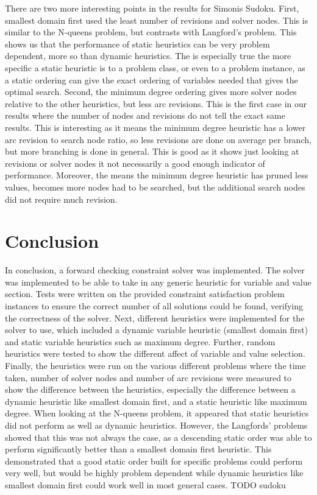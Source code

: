 \documentclass{article}
\begin{document}
There are two more interesting points in the results for Simonis Sudoku. First, smallest domain first used the least number of revisions and solver nodes. This is similar to the N-queens problem, but contrasts with Langford's problem. This shows us that the performance of static heuristics can be very problem dependent, more so than dynamic heuristics. The is especially true the more specific a static heuristic is to a problem class, or even to a problem instance, as a static ordering can give the exact ordering of variables needed that gives the optimal search. Second, the minimum degree ordering gives more solver nodes relative to the other heuristics, but less arc revisions. This is the first case in our results where the number of nodes and revisions do not tell the exact same results. This is interesting as it means the minimum degree heuristic has a lower arc revision to search node ratio, so less revisions are done on average per branch, but more branching is done in general. This is good as it shows just looking at revisions or solver nodes it not necessarily a good enough indicator of performance. Moreover, the means the minimum degree heuristic has pruned less values, becomes more nodes had to be searched, but the additional search nodes did not require much revision.

\section{Conclusion}
In conclusion, a forward checking constraint solver was implemented. The solver was implemented to be able to take in any generic heuristic for variable and value section. Tests were written on the provided constraint satisfaction problem instances to ensure the correct number of all solutions could be found, verifying the correctness of the solver. 
\n
Next, different heuristics were implemented for the solver to use, which included a dynamic variable heuristic (smallest domain first) and static variable heuristics such as maximum degree. Further, random heuristics were tested to show the different affect of variable and value selection. 
\n
Finally, the heuristics were run on the various different problems where the time taken, number of solver nodes and number of arc revisions were measured to show the difference between the heuristics, especially the difference between a dynamic heuristic like smallest domain first, and a static heuristic like maximum degree. When looking at the N-queens problem, it appeared that static heuristics did not perform as well as dynamic heuristics. However, the Langfords' problems showed that this was not always the case, as a descending static order was able to perform significantly better than a smallest domain first heuristic. This demonstrated that a good static order built for specific problems could perform very well, but would be highly problem dependent while dynamic heuristics like smallest domain first could work well in most general cases. TODO sudoku


\printbibliography
\end{document}
